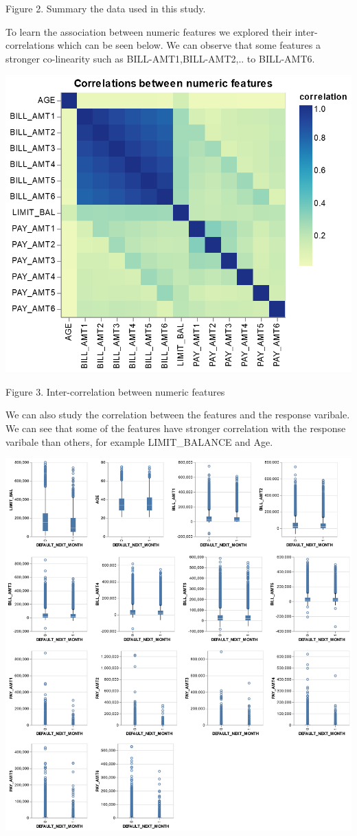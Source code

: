 \documentclass[11pt]{article}
\makeatletter
\def\maxwidth{\ifdim\Gin@nat@width>\linewidth\linewidth
    \else\Gin@nat@width\fi}
\let\Oldincludegraphics\includegraphics
\renewcommand{\includegraphics}[1]{\Oldincludegraphics[width=.8\maxwidth]{#1}}
\makeatother
\begin{document}
    Figure 2. Summary the data used in this study.

    To learn the association between numeric features we explored their
inter-correlations which can be seen below. We can observe that some
features a stronger co-linearity such as BILL-AMT1,BILL-AMT2,.. to
BILL-AMT6.

    \includegraphics{../results/num_corr_chart.png}

    Figure 3. Inter-correlation between numeric features

    We can also study the correlation between the features and the response
varibale. We can see that some of the features have stronger correlation
with the response varibale than others, for example LIMIT\_BALANCE and
Age.

    \includegraphics{../results/num_res_chart.png}
\end{document}
